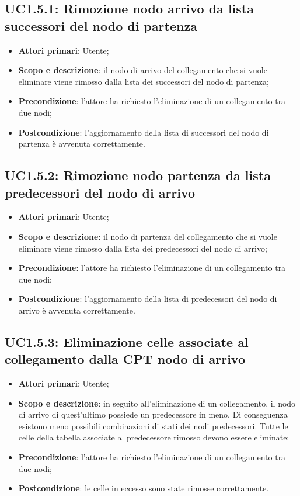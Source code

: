 \subsection{UC1.5.1: Rimozione nodo arrivo da lista successori del nodo di partenza} 
\hypertarget{UC1.5.1}{} 
\begin{itemize} 
	\item{\textbf{Attori primari}: Utente;} 
	\item{\textbf{Scopo e descrizione}: il nodo di arrivo del collegamento che si vuole eliminare viene rimosso dalla lista dei successori del nodo di partenza;} 
	\item{\textbf{Precondizione}: l'attore ha richiesto l'eliminazione di un collegamento tra due nodi;} 
	\item{\textbf{Postcondizione}: l'aggiornamento della lista di successori del nodo di partenza è avvenuta correttamente.} 
\end{itemize} 
\subsection{UC1.5.2: Rimozione nodo partenza da lista predecessori del nodo di arrivo} 
\hypertarget{UC1.5.2}{} 
\begin{itemize} 
	\item{\textbf{Attori primari}: Utente;} 
	\item{\textbf{Scopo e descrizione}: il nodo di partenza del collegamento che si vuole eliminare viene rimosso dalla lista dei predecessori del nodo di arrivo;} 
	\item{\textbf{Precondizione}: l'attore ha richiesto l'eliminazione di un collegamento tra due nodi;} 
	\item{\textbf{Postcondizione}: l'aggiornamento della lista di predecessori del nodo di arrivo è avvenuta correttamente.} 
\end{itemize} 
\subsection{UC1.5.3: Eliminazione celle associate al collegamento dalla CPT nodo di arrivo} 
\hypertarget{UC1.5.3}{} 
\begin{itemize} 
	\item{\textbf{Attori primari}: Utente;} 
	\item{\textbf{Scopo e descrizione}: in seguito all'eliminazione di un collegamento, il nodo di arrivo di quest'ultimo possiede un predecessore in meno. Di conseguenza esistono meno possibili combinazioni di stati dei nodi predecessori. Tutte le celle della tabella associate al predecessore rimosso devono essere eliminate;} 
	\item{\textbf{Precondizione}: l'attore ha richiesto l'eliminazione di un collegamento tra due nodi;} 
	\item{\textbf{Postcondizione}: le celle in eccesso sono state rimosse correttamente.} 
\end{itemize} 

